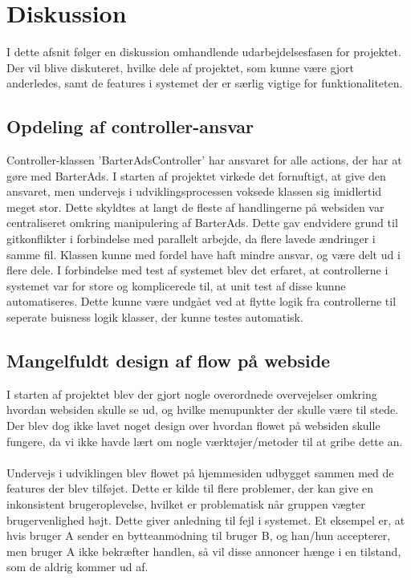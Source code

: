 \chapter{Diskussion}
I dette afsnit følger en diskussion omhandlende udarbejdelsesfasen for projektet. Der vil blive diskuteret, hvilke dele af projektet, som kunne være gjort anderledes, samt de features i systemet der er særlig vigtige for funktionaliteten.

\section{Opdeling af controller-ansvar}
Controller-klassen 'BarterAdsController' har ansvaret for alle actions, der har at gøre med BarterAds. I starten af projektet virkede det fornuftigt, at give den ansvaret, men undervejs i udviklingsprocessen voksede klassen sig imidlertid meget stor. Dette skyldtes at langt de fleste af handlingerne på websiden var centraliseret omkring manipulering af BarterAds. Dette gav endvidere  grund til gitkonflikter i forbindelse med parallelt arbejde, da flere lavede ændringer i samme fil. Klassen kunne med fordel have haft mindre ansvar, og være delt ud i flere dele.
I forbindelse med test af systemet blev det erfaret, at controllerne i systemet var for store og komplicerede til, at unit test af disse kunne automatiseres. Dette kunne være undgået ved at flytte logik fra controllerne til seperate buisness logik klasser, der kunne testes automatisk.

\section{Mangelfuldt design af flow på webside}
I starten af projektet blev der gjort nogle overordnede overvejelser omkring hvordan websiden skulle se ud, og hvilke menupunkter der skulle være til stede. Der blev dog ikke lavet noget design over hvordan flowet på websiden skulle fungere, da vi ikke havde lært om nogle værktøjer/metoder til at gribe dette an. \\ \\
Undervejs i udviklingen blev flowet på hjemmesiden udbygget sammen med de features der blev tilføjet. Dette er kilde til flere problemer, der kan give en inkonsistent brugeroplevelse, hvilket er problematisk når gruppen vægter brugervenlighed højt. 
Dette giver anledning til fejl i systemet. Et eksempel er, at hvis bruger A sender en bytteanmodning til bruger B, og han/hun accepterer, men bruger A ikke bekræfter handlen, så vil disse annoncer hænge i en tilstand, som de aldrig kommer ud af.\\

